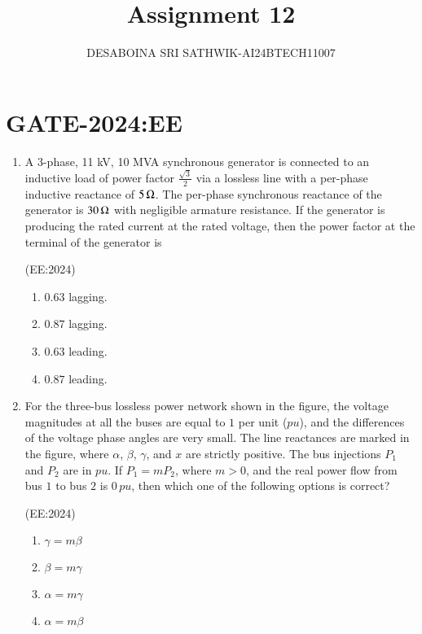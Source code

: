 \documentclass[journal,12pt,onecolumn]{IEEEtran}
\theoremstyle{remark}
\begin{document}

\vspace{3cm}

\title{Assignment 12}
\author{DESABOINA SRI SATHWIK-AI24BTECH11007}
\maketitle
\bigskip

\section*{GATE-2024:EE}
\begin{enumerate}
    \item A 3-phase, 11 kV, 10 MVA synchronous generator is connected to an inductive load of power factor $\frac{\sqrt{3}}{2}$ via a lossless line with a per-phase inductive reactance of $5 \,\ohm$. The per-phase synchronous reactance of the generator is $30\, \ohm$ with negligible armature resistance. If the generator is producing the rated current at the rated voltage, then the power factor at the terminal of the generator is
	   
	    \hfill{(EE:2024)}
		\begin{multicols}{4}
    \begin{enumerate}
        \item $0.63$ lagging.
        \item $0.87$ lagging.
        \item $0.63$ leading.
        \item $0.87$ leading.
    \end{enumerate}
\end{multicols}
    \item For the three-bus lossless power network shown in the figure, the voltage magnitudes at all the buses are equal to $1$ per unit ($pu$), and the differences of the voltage phase angles are very small. The line reactances are marked in the figure, where $\alpha$, $\beta$, $\gamma$, and $x$ are strictly positive. The bus injections $P_1$ and $P_2$ are in $pu$. If $P_1 = mP_2$, where $m > 0$, and the real power flow from bus $1$ to bus $2$ is $0\, pu$, then which one of the following options is correct?

	    
	    \hfill{(EE:2024)}
		\begin{multicols}{4}
    \begin{enumerate}
        \item $\gamma = m\beta$
        \item $\beta = m\gamma$
        \item $\alpha = m\gamma$
        \item $\alpha = m\beta$
    \end{enumerate}
			\end{multicols}


\end{enumerate}
\end{document}

